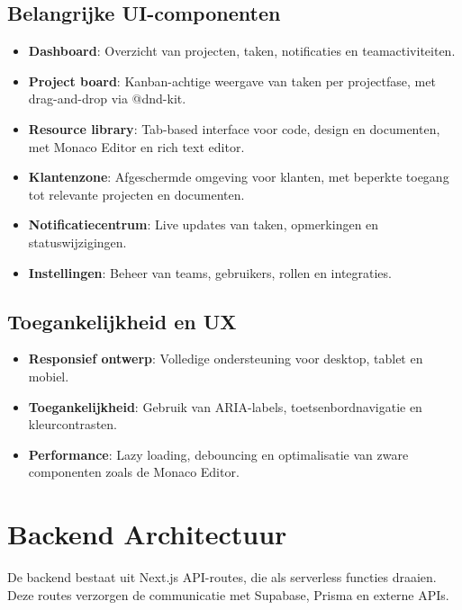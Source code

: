 \subsection{Belangrijke UI-componenten}
\begin{itemize}
    \item \textbf{Dashboard}: Overzicht van projecten, taken, notificaties en teamactiviteiten.
    \item \textbf{Project board}: Kanban-achtige weergave van taken per projectfase, met drag-and-drop via @dnd-kit.
    \item \textbf{Resource library}: Tab-based interface voor code, design en documenten, met Monaco Editor en rich text editor.
    \item \textbf{Klantenzone}: Afgeschermde omgeving voor klanten, met beperkte toegang tot relevante projecten en documenten.
    \item \textbf{Notificatiecentrum}: Live updates van taken, opmerkingen en statuswijzigingen.
    \item \textbf{Instellingen}: Beheer van teams, gebruikers, rollen en integraties.
\end{itemize}

\subsection{Toegankelijkheid en UX}
\begin{itemize}
    \item \textbf{Responsief ontwerp}: Volledige ondersteuning voor desktop, tablet en mobiel.
    \item \textbf{Toegankelijkheid}: Gebruik van ARIA-labels, toetsenbordnavigatie en kleurcontrasten.
    \item \textbf{Performance}: Lazy loading, debouncing en optimalisatie van zware componenten zoals de Monaco Editor.
\end{itemize}

\section{Backend Architectuur}
\label{sec:backend-architectuur}

De backend bestaat uit Next.js API-routes, die als serverless functies draaien. Deze routes verzorgen de communicatie met Supabase, Prisma en externe APIs.

